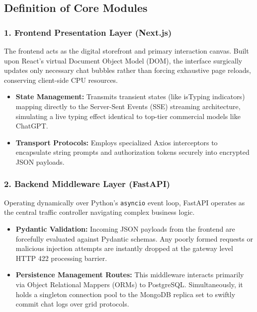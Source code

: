 \documentclass[12pt]{article}
\begin{document}
\subsection{Definition of Core Modules}

\subsubsection{1. Frontend Presentation Layer (Next.js)}
The frontend acts as the digital storefront and primary interaction canvas. Built upon React's virtual Document Object Model (DOM), the interface surgically updates only necessary chat bubbles rather than forcing exhaustive page reloads, conserving client-side CPU resources.
\begin{itemize}
    \item \textbf{State Management:} Transmits transient states (like isTyping indicators) mapping directly to the Server-Sent Events (SSE) streaming architecture, simulating a live typing effect identical to top-tier commercial models like ChatGPT.
    \item \textbf{Transport Protocols:} Employs specialized Axios interceptors to encapsulate string prompts and authorization tokens securely into encrypted JSON payloads.
\end{itemize}

\subsubsection{2. Backend Middleware Layer (FastAPI)}
Operating dynamically over Python’s \texttt{asyncio} event loop, FastAPI operates as the central traffic controller navigating complex business logic.
\begin{itemize}
    \item \textbf{Pydantic Validation:} Incoming JSON payloads from the frontend are forcefully evaluated against Pydantic schemas. Any poorly formed requests or malicious injection attempts are instantly dropped at the gateway level HTTP 422 processing barrier.
    \item \textbf{Persistence Management Routes:} This middleware interacts primarily via Object Relational Mappers (ORMs) to PostgreSQL. Simultaneously, it holds a singleton connection pool to the MongoDB replica set to swiftly commit chat logs over grid protocols.
\end{itemize}
\end{document}
